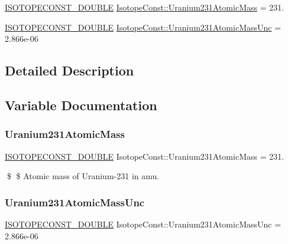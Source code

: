 \begin{DoxyCompactItemize}
\item 
\mbox{\hyperlink{group___isotope_const-_macros_ga8f45a7272ce02c0b4c65c44636ed719a}{I\+S\+O\+T\+O\+P\+E\+C\+O\+N\+S\+T\+\_\+\+D\+O\+U\+B\+LE}} \mbox{\hyperlink{group___isotope_const-_uranium-_u231_gaa5b875e58a81af70d632469eff693e7c}{Isotope\+Const\+::\+Uranium231\+Atomic\+Mass}} = 231.
\item 
\mbox{\hyperlink{group___isotope_const-_macros_ga8f45a7272ce02c0b4c65c44636ed719a}{I\+S\+O\+T\+O\+P\+E\+C\+O\+N\+S\+T\+\_\+\+D\+O\+U\+B\+LE}} \mbox{\hyperlink{group___isotope_const-_uranium-_u231_gab3e49dab2865638fe194d7f6dcdc55fa}{Isotope\+Const\+::\+Uranium231\+Atomic\+Mass\+Unc}} = 2.\+866e-\/06
\end{DoxyCompactItemize}


\subsection{Detailed Description}


\subsection{Variable Documentation}
\mbox{\label{group___isotope_const-_uranium-_u231_gaa5b875e58a81af70d632469eff693e7c}} 
\subsubsection{\texorpdfstring{Uranium231\+Atomic\+Mass}{Uranium231AtomicMass}}
{\footnotesize\ttfamily \mbox{\hyperlink{group___isotope_const-_macros_ga8f45a7272ce02c0b4c65c44636ed719a}{I\+S\+O\+T\+O\+P\+E\+C\+O\+N\+S\+T\+\_\+\+D\+O\+U\+B\+LE}} Isotope\+Const\+::\+Uranium231\+Atomic\+Mass = 231.}

\$ \$ Atomic mass of Uranium-\/231 in amu. \mbox{\label{group___isotope_const-_uranium-_u231_gab3e49dab2865638fe194d7f6dcdc55fa}} 
\subsubsection{\texorpdfstring{Uranium231\+Atomic\+Mass\+Unc}{Uranium231AtomicMassUnc}}
{\footnotesize\ttfamily \mbox{\hyperlink{group___isotope_const-_macros_ga8f45a7272ce02c0b4c65c44636ed719a}{I\+S\+O\+T\+O\+P\+E\+C\+O\+N\+S\+T\+\_\+\+D\+O\+U\+B\+LE}} Isotope\+Const\+::\+Uranium231\+Atomic\+Mass\+Unc = 2.\+866e-\/06}


